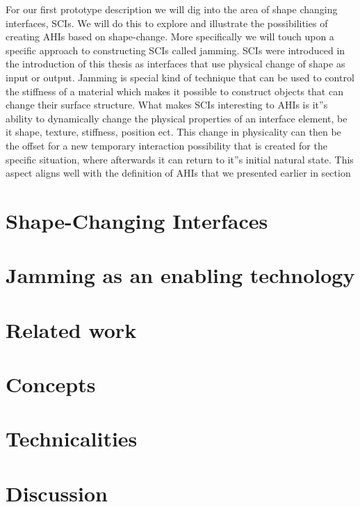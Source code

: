 For our first prototype description we will dig into the area of shape changing interfaces, SCIs.
We will do this to explore and illustrate the possibilities of creating AHIs based on shape-change.
More specifically we will touch upon a specific approach to constructing SCIs called jamming.
SCIs were introduced in the introduction of this thesis as interfaces that use physical change of shape as input or output.
Jamming is special kind of technique that can be used to control the stiffness of a material which makes it possible to construct objects that can change their surface structure.
What makes SCIs interesting to AHIs is it''s ability to dynamically change the physical properties of an interface element, be it shape, texture, stiffness, position ect.
This change in physicality can then be the offset for a new temporary interaction possibility that is created for the specific situation, where afterwards it can return to it''s initial natural state.
This aspect aligns well with the definition of AHIs that we presented earlier in section  

\section{Shape-Changing Interfaces}
\label{ch:jamming:shape-change} 


\section{Jamming as an enabling technology}
\label{ch:jamming:enabling-technology} 


\section{Related work}
\label{ch:jamming:related-work} 


\section{Concepts}
\label{ch:jamming:concepts} 


\section{Technicalities}
\section{Discussion}
